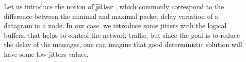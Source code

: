 \documentclass[10pt]{article}
\begin{document}
Let us introduce the notion of {\bf jitter} \cite{guillemin_peak_1992} , which commonly correspond to the difference between the minimal and maximal packet delay variation of a datagram in a node. In our case, we introduce some jitters with the logical buffers, that helps to control the network traffic, but since the goal is to reduce the delay of the messages, one can imagine that good deterministic solution will have some low jitters values.



\end{document}
